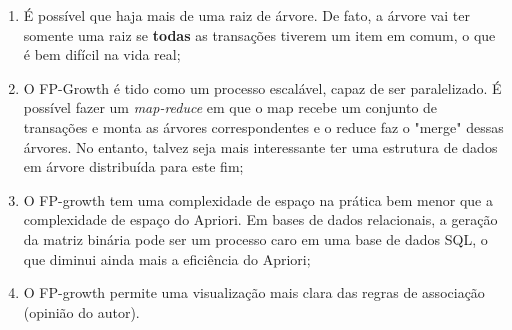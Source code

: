 \documentclass[12pt]{article}
\begin{document}
\begin{enumerate}
    \item É possível que haja mais de uma raiz de árvore. De fato, a árvore vai ter somente uma raiz se \textbf{todas} as transações tiverem um item em comum, o que é bem difícil na vida real;
    \item O FP-Growth é tido como um processo escalável, capaz de ser paralelizado. É possível fazer um \textit{map-reduce} em que o map recebe um conjunto de transações e monta as árvores correspondentes e o reduce faz o "merge" dessas árvores. No entanto, talvez seja mais interessante ter uma estrutura de dados em árvore distribuída para este fim;
    \item O FP-growth tem uma complexidade de espaço na prática bem menor que a complexidade de espaço do Apriori. Em bases de dados relacionais, a geração da matriz binária pode ser um processo caro em uma base de dados SQL, o que diminui ainda mais a eficiência do Apriori;
    \item O FP-growth permite uma visualização mais clara das regras de associação (opinião do autor).
\end{enumerate}



\end{document}
